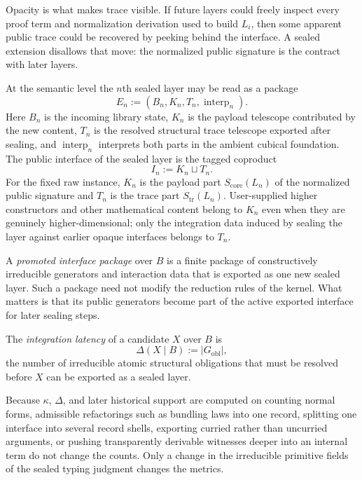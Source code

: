 \documentclass{lmcs}
\begin{document}
Opacity is what makes trace visible.  If future layers could freely inspect every proof term and
normalization derivation used to build \(L_i\), then some apparent public trace could be
recovered by peeking behind the interface.  A sealed extension disallows that move: the
normalized public signature is the contract with later layers.

\begin{defi}
At the semantic level the \(n\)th sealed layer may be read as a package
\[
  E_n := (B_n,K_n,T_n,\operatorname{interp}_n).
\]
Here \(B_n\) is the incoming library state, \(K_n\) is the payload telescope contributed by
the new content, \(T_n\) is the resolved structural trace telescope exported after sealing, and
\(\operatorname{interp}_n\) interprets both parts in the ambient cubical foundation.  The public
interface of the sealed layer is the tagged coproduct
\[
  I_n := K_n \sqcup T_n.
\]
For the fixed raw instance, \(K_n\) is the payload part \(S_{\mathrm{core}}(L_n)\) of the
normalized public signature and \(T_n\) is the trace part \(S_{\mathrm{tr}}(L_n)\).  User-supplied
higher constructors and other mathematical content belong to \(K_n\) even when they are
genuinely higher-dimensional; only the integration data induced by sealing the layer against
earlier opaque interfaces belongs to \(T_n\).
\end{defi}

\begin{defi}
A \emph{promoted interface package} over \(B\) is a finite package of constructively
irreducible generators and interaction data that is exported as one new sealed layer.  Such a
package need not modify the reduction rules of the kernel.  What matters is that its public
generators become part of the active exported interface for later sealing steps.
\end{defi}

\begin{defi}
The \emph{integration latency} of a candidate \(X\) over \(B\) is
\[
  \Delta(X\mid B) := |G_{\mathrm{obl}}|,
\]
the number of irreducible atomic structural obligations that must be resolved before \(X\)
can be exported as a sealed layer.
\end{defi}

\begin{rem}
Because \(\kappa\), \(\Delta\), and later historical support are computed on counting normal
forms, admissible refactorings such as bundling laws into one record, splitting one interface
into several record shells, exporting curried rather than uncurried arguments, or pushing
transparently derivable witnesses deeper into an internal term do not change the counts.
Only a change in the irreducible primitive fields of the sealed typing judgment changes the
metrics.
\end{rem}
\end{document}
